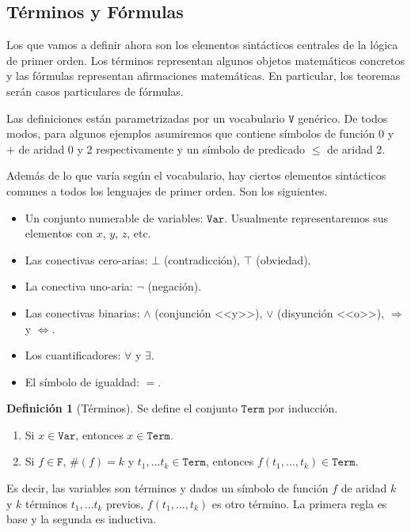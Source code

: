 \documentclass[a4paper, 12pt]{report}
\newcommand{\Ra}{\Rightarrow}
\newcommand{\Lra}{\Leftrightarrow}
\theoremstyle{definition}
\newtheorem{definicion}[teorema]{Definición}
\begin{document}
\subsection{Términos y Fórmulas}

Los que vamos a definir ahora son los elementos sintácticos centrales de la lógica de primer orden. Los términos representan algunos objetos matemáticos concretos y las fórmulas representan afirmaciones matemáticas. En particular, los teoremas serán casos particulares de fórmulas.

Las definiciones están parametrizadas por un vocabulario $\mathtt{V}$ genérico. De todos modos, para algunos ejemplos asumiremos que contiene símbolos de función $0$ y $+$ de aridad 0 y 2 respectivamente y un símbolo de predicado $\leq$ de aridad 2.

Además de lo que varía según el vocabulario, hay ciertos elementos sintácticos comunes a todos los lenguajes de primer orden. Son los siguientes.
\begin{itemize}
	\item Un conjunto numerable de variables: $\mathtt{Var}$. Usualmente representaremos sus elementos con $x$, $y$, $z$, etc.
	\item Las conectivas cero-arias: $\bot$ (contradicción), $\top$ (obviedad).
	\item La conectiva uno-aria: $\lnot$ (negación).
	\item Las conectivas binarias: $\wedge$ (conjunción <<y>>), $\vee$ (disyunción <<o>>),  $\Ra$ y $\Lra$.
	\item Los cuantificadores: $\forall$ y $\exists$.
	\item El símbolo de igualdad: $=$.
\end{itemize}

\begin{definicion}[Términos]
	Se define el conjunto $\mathtt{Term}$ por inducción.
	\begin{enumerate}
		\item Si $x\in\mathtt{Var}$, entonces $x\in\mathtt{Term}$.
		\item Si $f\in\mathtt{F}$, $\#(f)=k$ y $t_1,\dots t_k\in\mathtt{Term}$, entonces $f(t_1,\dots,t_k)\in\mathtt{Term}$.
	\end{enumerate}
	Es decir, las variables son términos y dados un símbolo de función $f$ de aridad $k$ y $k$ términos $t_1,\dots t_k$ previos, $f(t_1,\dots,t_k)$ es otro término. La primera regla es base y la segunda es inductiva.
\end{definicion}
\end{document}
